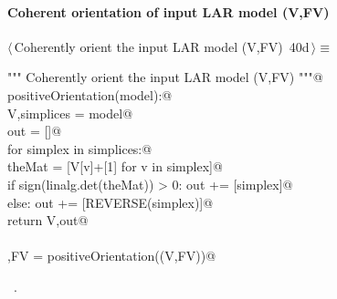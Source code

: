 \documentclass[11pt,oneside]{article}    %
\begin{document}
\paragraph{Coherent orientation of input LAR model (V,FV)}
\begin{flushleft} \small \label{scrap64}
\protect{}$\langle\,$Coherently orient the input LAR model (V,FV)\nobreak\ {\footnotesize 40d}$\,\rangle\equiv$
\vspace{-1ex}
\begin{list}{}{} \item
\mbox{}\verb@""" Coherently orient the input LAR model (V,FV) """@\\
\mbox{}\verb@def positiveOrientation(model):@\\
\mbox{}\verb@    V,simplices = model@\\
\mbox{}\verb@    out = []@\\
\mbox{}\verb@    for simplex in simplices:@\\
\mbox{}\verb@        theMat = [V[v]+[1] for v in simplex]@\\
\mbox{}\verb@        if sign(linalg.det(theMat)) > 0:  out += [simplex]@\\
\mbox{}\verb@        else: out += [REVERSE(simplex)]@\\
\mbox{}\verb@    return V,out@\\
\mbox{}\verb@@\\
\mbox{}\verb@V,FV = positiveOrientation((V,FV))@\\
\mbox{}\verb@@{\NWsep}
\end{list}
\vspace{-1ex}
\footnotesize\addtolength{\baselineskip}{-1ex}
\begin{list}{}{\setlength{\itemsep}{-\parsep}\setlength{\itemindent}{-\leftmargin}}
\item \NWtxtMacroRefIn\ .
\end{list}
\end{flushleft}
\end{document}
